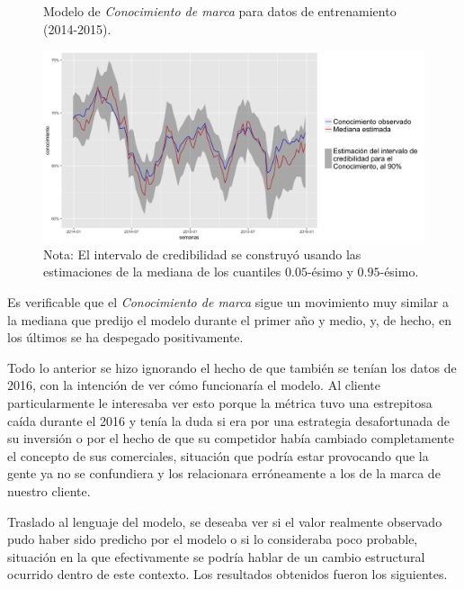 \begin{figure}[H]
	\centering
	\caption{Modelo de \textit{Conocimiento de marca} para datos de entrenamiento (2014-2015).}
	\includegraphics[width=1\textwidth]{Figures/MarketResearch/fit_review.png}
	\captionsetup{singlelinecheck=off,font=footnotesize}
	\caption*{Nota: El intervalo de credibilidad se construy\'o usando las estimaciones de la mediana de los cuantiles $0.05$-\'esimo y $0.95$-\'esimo.}
	\label{awareness_fit}
\end{figure}

Es verificable que el \textit{Conocimiento de marca} sigue un movimiento muy similar a la mediana que predijo el modelo durante el primer año y medio, y, de hecho, en los \'ultimos se ha despegado positivamente.

Todo lo anterior se hizo ignorando el hecho de que tambi\'en se ten\'ian los datos de 2016, con la intenci\'on de ver c\'omo funcionar\'ia el modelo. Al cliente particularmente le interesaba ver esto porque la m\'etrica tuvo una estrepitosa ca\'ida durante el 2016 y ten\'ia la duda si era por una estrategia desafortunada de su inversi\'on o por el hecho de que su competidor hab\'ia cambiado completamente el concepto de sus comerciales, situaci\'on que podr\'ia estar provocando que la gente ya no se confundiera y los relacionara err\'oneamente a los de la marca de nuestro cliente.

Traslado al lenguaje del modelo, se deseaba ver si el valor realmente observado pudo haber sido predicho por el modelo o si lo consideraba poco probable, situaci\'on en la que efectivamente se podr\'ia hablar de un cambio estructural ocurrido dentro de este contexto. Los resultados obtenidos fueron los siguientes.

